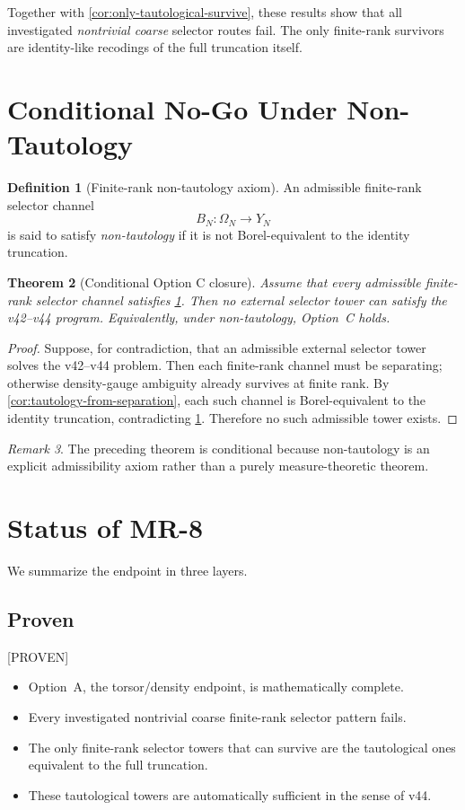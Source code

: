 \documentclass[11pt,a4paper]{article}
\newtheorem{theorem}{Theorem}[section]
\theoremstyle{definition}
\newtheorem{definition}[theorem]{Definition}
\theoremstyle{remark}
\newtheorem{remark}[theorem]{Remark}
\newcommand{\statusproven}{\textcolor{green!50!black}{\textsf{[PROVEN]}}}
\begin{document}
Together with \cref{cor:only-tautological-survive}, these results show
that all investigated \emph{nontrivial coarse} selector routes fail.  The
only finite-rank survivors are identity-like recodings of the full
truncation itself.

\section{Conditional No-Go Under Non-Tautology}

\begin{definition}[Finite-rank non-tautology axiom]
\label{def:NT}
An admissible finite-rank selector channel
\[
B_N:\Omega_N\to Y_N
\]
is said to satisfy \emph{non-tautology} if it is not Borel-equivalent to
the identity truncation.
\end{definition}

\begin{theorem}[Conditional Option C closure]
\label{thm:conditional-option-c}
Assume that every admissible finite-rank selector channel satisfies
\cref{def:NT}.  Then no external selector tower can satisfy the v42--v44
program.  Equivalently, under non-tautology, Option~C holds.
\end{theorem}

\begin{proof}
Suppose, for contradiction, that an admissible external selector tower
solves the v42--v44 problem.  Then each finite-rank channel must be
separating; otherwise density-gauge ambiguity already survives at finite
rank.  By \cref{cor:tautology-from-separation}, each such channel is
Borel-equivalent to the identity truncation, contradicting
\cref{def:NT}.  Therefore no such admissible tower exists.
\end{proof}

\begin{remark}
The preceding theorem is conditional because non-tautology is an explicit
admissibility axiom rather than a purely measure-theoretic theorem.
\end{remark}

\section{Status of MR-8}

We summarize the endpoint in three layers.

\subsection*{Proven}
\statusproven
\begin{itemize}[leftmargin=2em]
  \item Option~A, the torsor/density endpoint, is mathematically complete.
  \item Every investigated nontrivial coarse finite-rank selector
        pattern fails.
  \item The only finite-rank selector towers that can survive are the
        tautological ones equivalent to the full truncation.
  \item These tautological towers are automatically sufficient in the
        sense of v44.
\end{itemize}
\end{document}
